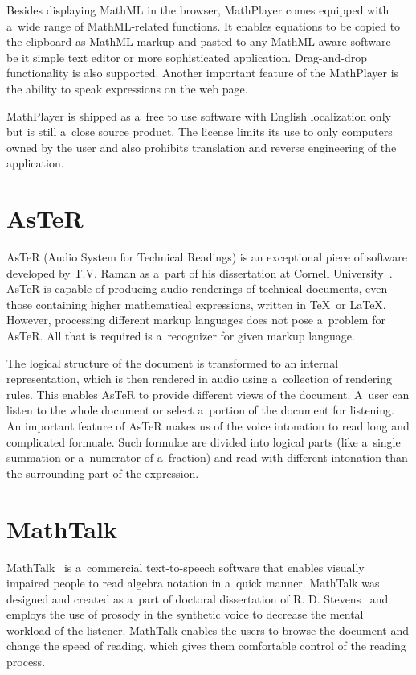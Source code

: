 \documentclass[11pt,oneside,final]{fithesis2}
\def\s#1{#1\index{#1}}
\begin{document}
Besides displaying MathML in the browser, MathPlayer comes equipped with a~wide range of MathML-related functions. It enables equations to be copied to the clipboard as MathML markup and pasted to any MathML-aware software~- be it simple text editor or more sophisticated application. Drag-and-drop functionality is also supported. Another important feature of the MathPlayer is the ability to speak expressions on the web page.

MathPlayer is shipped as a~free to use software with English localization only but is still a~close source product. The license limits its use to only computers owned by the user and also prohibits translation and reverse engineering of the application.

\section{AsTeR}
\s{AsTeR} (Audio System for Technical Readings) is an exceptional piece of software developed by T.V. Raman as a~part of his dissertation at Cornell University~\cite{aster1994}. AsTeR is capable of producing audio renderings of technical documents, even those containing higher mathematical expressions, written in \TeX\ or \LaTeX. However, processing different markup languages does not pose a~problem for AsTeR. All that is required is a~recognizer for given markup language. 

The logical structure of the document is transformed to an internal representation, which is then rendered in audio using a~collection of rendering rules. This enables AsTeR to provide different views of the document. A~user can listen to the whole document or select a~portion of the document for listening. An important feature of AsTeR makes us of the voice intonation to read long and complicated formuale. Such formulae are divided into logical parts (like a~single summation or a~numerator of a~fraction) and read with different intonation than the surrounding part of the expression. 

\section{MathTalk}
\s{MathTalk}~\cite{mathtalk:stevens1994mathtalk} is a~commercial text-to-speech software that enables visually impaired people to read algebra notation in a~quick manner. MathTalk was designed and created as a~part of doctoral dissertation of R. D. Stevens~\cite{mathtalk:stevens1996principles} and employs the use of prosody in the synthetic voice to decrease the mental workload of the listener. MathTalk enables the users to browse the document and change the speed of reading, which gives them comfortable control of the reading process.
\end{document}
